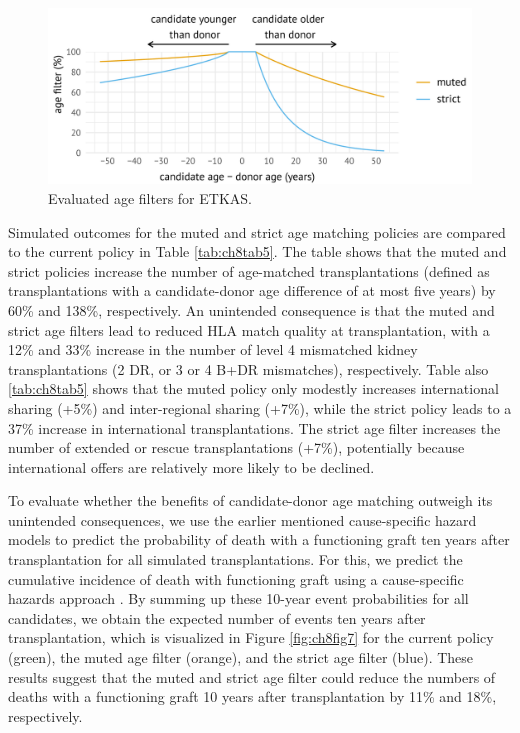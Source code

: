 \documentclass[11pt,twoside,]{book}
\begin{document}
\begin{figure}[ht]

{\centering \includegraphics[width=1\linewidth]{figures/ch8//fig6-age_matching_policies} 

}

\caption{Evaluated age filters for ETKAS.}\label{fig:ch8fig6}
\end{figure}

Simulated outcomes for the muted and strict age matching policies are
compared to the current policy in Table
\ref{tab:ch8tab5}. The table shows that the muted
and strict policies increase the number of age-matched transplantations (defined as
transplantations with a candidate-donor age difference of at most five years) by 60\% and 138\%, respectively.
An unintended consequence is that the muted and strict age filters lead to reduced
HLA match quality at transplantation, with a 12\% and 33\% increase
in the number of level 4 mismatched kidney transplantations (2 DR, or 3 or 4 B+DR
mismatches), respectively. Table also
\ref{tab:ch8tab5} shows that the muted policy
only modestly increases international sharing (+5\%) and inter-regional
sharing (+7\%), while the strict policy leads to a 37\% increase in
international transplantations. The
strict age filter increases the number of extended or rescue
transplantations (+7\%), potentially because international offers are
relatively more likely to be declined.

To evaluate whether the benefits of candidate-donor age matching outweigh
its unintended consequences, we use the earlier mentioned cause-specific
hazard models to predict the probability of death with a functioning
graft ten years after transplantation for all simulated
transplantations. For this, we predict the cumulative incidence of death
with functioning graft using a cause-specific hazards approach \citep{wreedeMstatePackageAnalysis2011}. By summing up these 10-year event probabilities
for all candidates, we obtain the expected number of events ten years after
transplantation, which is visualized in Figure \ref{fig:ch8fig7} for the current policy
(green), the muted age filter (orange), and the strict age filter
(blue). These results suggest that the muted and strict age filter could
reduce the numbers of deaths with a functioning graft 10 years after
transplantation by 11\% and 18\%, respectively.
\end{document}
